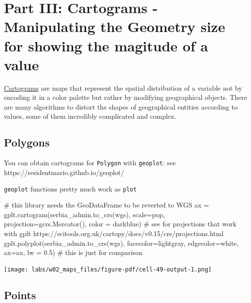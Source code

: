 \documentclass[
  letterpaper,
  DIV=11,
  numbers=noendperiod]{scrreprt}
\newenvironment{Shaded}{\begin{snugshade}}{\end{snugshade}}
\newcommand{\CommentTok}[1]{\textcolor[rgb]{0.37,0.37,0.37}{#1}}
\newcommand{\FloatTok}[1]{\textcolor[rgb]{0.68,0.00,0.00}{#1}}
\newcommand{\NormalTok}[1]{\textcolor[rgb]{0.00,0.23,0.31}{#1}}
\newcommand{\OperatorTok}[1]{\textcolor[rgb]{0.37,0.37,0.37}{#1}}
\newcommand{\StringTok}[1]{\textcolor[rgb]{0.13,0.47,0.30}{#1}}
\begin{document}
\section{Part III: Cartograms - Manipulating the Geometry size for
showing the magitude of a
value}\label{part-iii-cartograms---manipulating-the-geometry-size-for-showing-the-magitude-of-a-value}

\href{https://www.data-to-viz.com/graph/cartogram.html}{Cartograms} are
maps that represent the spatial distribution of a variable not by
encoding it in a color palette but rather by modifying geographical
objects. There are many algorithms to distort the shapes of geographical
entities according to values, some of them incredibly complicated and
complex.

\subsection{Polygons}\label{polygons}

You can obtain cartograms for \texttt{Polygon} with \texttt{geoplot}:
see https://residentmario.github.io/geoplot/

\texttt{geoplot} functions pretty much work as \texttt{plot}

\begin{Shaded}
\begin{Highlighting}[]
\CommentTok{\# this library needs the GeoDataFrame to be reverted to WGS}
\NormalTok{ax }\OperatorTok{=}\NormalTok{ gplt.cartogram(serbia\_admin.to\_crs(wgs), scale}\OperatorTok{=}\StringTok{\textquotesingle{}pop\textquotesingle{}}\NormalTok{, projection}\OperatorTok{=}\NormalTok{gcrs.Mercator(), color }\OperatorTok{=} \StringTok{\textquotesingle{}darkblue\textquotesingle{}}\NormalTok{)}
\CommentTok{\# see for projections that work with gplt https://scitools.org.uk/cartopy/docs/v0.15/crs/projections.html}
\NormalTok{gplt.polyplot(serbia\_admin.to\_crs(wgs), facecolor}\OperatorTok{=}\StringTok{\textquotesingle{}lightgray\textquotesingle{}}\NormalTok{, edgecolor}\OperatorTok{=}\StringTok{\textquotesingle{}white\textquotesingle{}}\NormalTok{, ax}\OperatorTok{=}\NormalTok{ax, lw }\OperatorTok{=} \FloatTok{0.5}\NormalTok{) }\CommentTok{\# this is just for comparison}
\end{Highlighting}
\end{Shaded}

\texttt{[image: labs/w02\_maps\_files/figure-pdf/cell-49-output-1.png]}

\subsection{Points}\label{points}
\end{document}
